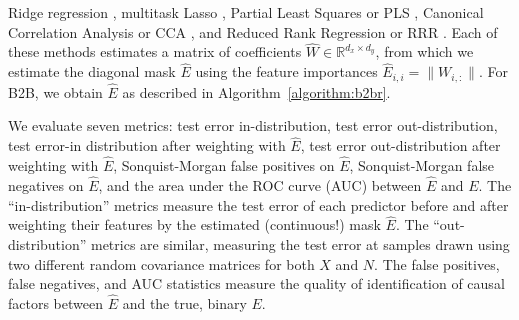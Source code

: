 \iffalse
Ridge regression \citep{hoerl1959optimum}, multitask Lasso \citep{argyriou2008convex}, Partial Least Squares or PLS \citep{wold_pls, tenenhaus_pls}, Canonical Correlation Analysis or CCA \citep{cca_hotelling}, and Reduced Rank Regression or RRR \citep{Izenman_rrr}.
%
Each of these methods estimates a matrix of coefficients $\hat{W} \in \mathbb{R}^{d_x \times d_y}$, from which we estimate the diagonal mask $\hat{E}$ using the feature importances $\hat{E}_{i,i} = \| W_{i, :} \|$.
%
For B2B, we obtain $\hat{E}$ as described in Algorithm~\ref{algorithm:b2br}.
%


We evaluate seven metrics:
%
test error in-distribution, test error out-distribution, test error-in distribution after weighting with $\hat{E}$, test error out-distribution after weighting with $\hat{E}$, Sonquist-Morgan false positives on $\hat{E}$, Sonquist-Morgan false negatives on $\hat{E}$, and the area under the ROC curve (AUC) between $\hat{E}$ and $E$.
%
The ``in-distribution'' metrics measure the test error of each predictor before and after weighting their features by the estimated (continuous!) mask $\hat{E}$.
%
The ``out-distribution'' metrics are similar, measuring the test error at samples drawn using two different random covariance matrices for both $X$ and $N$.
%
The false positives, false negatives, and AUC statistics measure the quality of identification of causal factors between $\hat{E}$ and the true, binary $E$.

